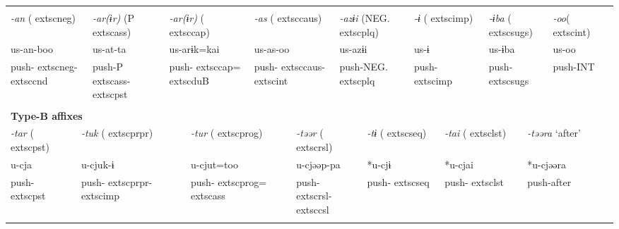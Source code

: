 \tabletail{}
\tablelasttail{}
\begin{tabularx}{\textwidth}{XXm{}XXXXXXXXXXXXXXXXXXXX}
\lsptoprule
\multicolumn{23}{X}{{\bfseries Type-A affixes}}\\
\multicolumn{3}{X}{{ \textit{{}-an} (	extsc{neg})}} & \multicolumn{3}{X}{{ \textit{{}-ar(ɨr)} (P	extsc{ass})}} & \multicolumn{4}{X}{{ \textit{{}-ar(ɨr)} (	extsc{cap})}} & \multicolumn{4}{X}{{ \textit{{}-as} (	extsc{caus})}} & \multicolumn{3}{X}{{ \textit{{}-azɨi} (NEG.	extsc{plq})}} & \multicolumn{2}{X}{{ \textit{{}-ɨ} (	extsc{imp})}} & \multicolumn{2}{X}{{ \textit{{}-ɨba} (	extsc{sugs})}} & { \textit{{}-oo}(	extsc{int})} & \\
\multicolumn{3}{X}{{ us-an-boo}} & \multicolumn{3}{X}{{ us-at-ta}} & \multicolumn{4}{X}{{ us-arɨk=kai}} & \multicolumn{4}{X}{{ us-as-oo}} & \multicolumn{3}{X}{{ us-azɨi}} & \multicolumn{2}{X}{{ us-ɨ}} & \multicolumn{2}{X}{{ us-ɨba}} & { us-oo} & \\
\multicolumn{3}{X}{push-	extsc{neg}-	extsc{cnd}} & \multicolumn{3}{X}{push-P	extsc{ass}-	extsc{pst}} & \multicolumn{4}{X}{push-	extsc{cap}=	extsc{du}B} & \multicolumn{4}{X}{push-	extsc{caus}-	extsc{int}} & \multicolumn{3}{X}{push-NEG.	extsc{plq}} & \multicolumn{2}{X}{push-	extsc{imp}} & \multicolumn{2}{X}{push-	extsc{sugs}} & push-INT & \\
\multicolumn{23}{X}{}\\
\multicolumn{23}{X}{{\bfseries Type-B affixes}}\\
\multicolumn{2}{X}{{ \textit{{}-tar} (	extsc{pst})}} & \multicolumn{6}{X}{{ \textit{{}-tuk} (	extsc{prpr})}} & \multicolumn{3}{X}{{ \textit{{}-tur} (	extsc{prog})}} & \multicolumn{4}{X}{{ \textit{{}-təər} (	extsc{rsl})}} & \multicolumn{3}{X}{{ \textit{{}-tɨ} (	extsc{seq})}} & \multicolumn{2}{X}{{ \textit{{}-tai} (	extsc{lst})}} & \multicolumn{3}{X}{{ \textit{{}-təəra} ‘after’}}\\
\multicolumn{2}{X}{{ u-cja}} & \multicolumn{6}{X}{{ u-cjuk-ɨ}} & \multicolumn{3}{X}{{ u-cjut=too}} & \multicolumn{4}{X}{{ u-cjəəp-pa}} & \multicolumn{3}{X}{{ *u-cjɨ}} & \multicolumn{2}{X}{{ *u-cjai}} & \multicolumn{3}{X}{{ *u-cjəəra}}\\
\multicolumn{2}{X}{push-	extsc{pst}} & \multicolumn{6}{X}{push-	extsc{prpr}-	extsc{imp}} & \multicolumn{3}{X}{push-	extsc{prog}=	extsc{ass}} & \multicolumn{4}{X}{push-	extsc{rsl}-	extsc{csl}} & \multicolumn{3}{X}{push-	extsc{seq}} & \multicolumn{2}{X}{push-	extsc{lst}} & \multicolumn{3}{X}{{ push-after}}\\
\multicolumn{2}{X}{} & \multicolumn{6}{X}{} & \multicolumn{3}{X}{} & \multicolumn{4}{X}{} & \multicolumn{3}{X}{} & \multicolumn{2}{X}{} & \multicolumn{3}{X}{}\\

\end{tabularx}

